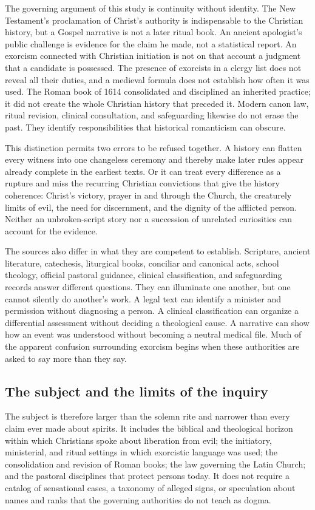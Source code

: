 The governing argument of this study is continuity without identity. The New
Testament's proclamation of Christ's authority is indispensable to the
Christian history, but a Gospel narrative is not a later ritual book. An
ancient apologist's public challenge is evidence for the claim he made, not a
statistical report. An exorcism connected with Christian initiation is not on
that account a judgment that a candidate is possessed. The presence of
exorcists in a clergy list does not reveal all their duties, and a medieval
formula does not establish how often it was used. The Roman book of 1614
consolidated and disciplined an inherited practice; it did not create the
whole Christian history that preceded it. Modern canon law, ritual revision,
clinical consultation, and safeguarding likewise do not erase the past. They
identify responsibilities that historical romanticism can obscure.

This distinction permits two errors to be refused together. A history can
flatten every witness into one changeless ceremony and thereby make later
rules appear already complete in the earliest texts. Or it can treat every
difference as a rupture and miss the recurring Christian convictions that
give the history coherence: Christ's victory, prayer in and through the
Church, the creaturely limits of evil, the need for discernment, and the
dignity of the afflicted person. Neither an unbroken-script story nor a
succession of unrelated curiosities can account for the evidence.

The sources also differ in what they are competent to establish. Scripture,
ancient literature, catechesis, liturgical books, conciliar and canonical
acts, school theology, official pastoral guidance, clinical classification,
and safeguarding records answer different questions. They can illuminate one
another, but one cannot silently do another's work. A legal text can identify
a minister and permission without diagnosing a person. A clinical
classification can organize a differential assessment without deciding a
theological cause. A narrative can show how an event was understood without
becoming a neutral medical file. Much of the apparent confusion surrounding
exorcism begins when these authorities are asked to say more than they say.

\subsection{The subject and the limits of the inquiry}

The subject is therefore larger than the solemn rite and narrower than every
claim ever made about spirits. It includes the biblical and theological
horizon within which Christians spoke about liberation from evil; the
initiatory, ministerial, and ritual settings in which exorcistic language was
used; the consolidation and revision of Roman books; the law governing the
Latin Church; and the pastoral disciplines that protect persons today. It
does not require a catalog of sensational cases, a taxonomy of alleged signs,
or speculation about names and ranks that the governing authorities do not
teach as dogma.

